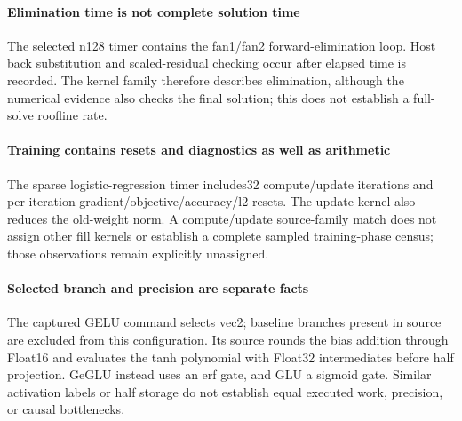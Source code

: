 \paragraph{Elimination time is not complete solution time} The selected n128 timer contains the fan1/fan2 forward-elimination loop. Host back substitution and scaled-residual checking occur after elapsed time is recorded. The kernel family therefore describes elimination, although the numerical evidence also checks the final solution; this does not establish a full-solve roofline rate.

\paragraph{Training contains resets and diagnostics as well as arithmetic} The sparse logistic-regression timer includes32 compute/update iterations and per-iteration gradient/objective/accuracy/l2 resets. The update kernel also reduces the old-weight norm. A compute/update source-family match does not assign other fill kernels or establish a complete sampled training-phase census; those observations remain explicitly unassigned.

\paragraph{Selected branch and precision are separate facts} The captured GELU command selects vec2; baseline branches present in source are excluded from this configuration. Its source rounds the bias addition through Float16 and evaluates the tanh polynomial with Float32 intermediates before half projection. GeGLU instead uses an erf gate, and GLU a sigmoid gate. Similar activation labels or half storage do not establish equal executed work, precision, or causal bottlenecks.
